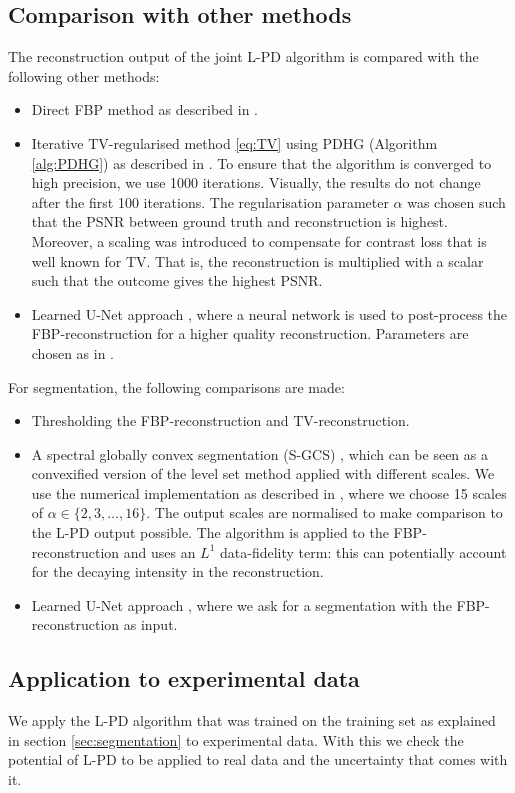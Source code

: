 \documentclass[journal]{IEEEtran}
\newcommand{\hl}[1]{#1}
\begin{document}
\subsection{Comparison with other methods}\label{sec:comparison}
{The reconstruction output of the joint L-PD algorithm is compared with the following other methods:
\begin{itemize}
\item Direct FBP method as described in \cite{Willemink2010}.
\item Iterative TV-regularised method \eqref{eq:TV} using PDHG (Algorithm \ref{alg:PDHG}) as described in \cite{Boink2018}. To ensure that the algorithm is converged to high precision, we use 1000 iterations. Visually, the results do not change after the first 100 iterations. The regularisation parameter $\alpha$ was chosen such that the PSNR between ground truth and reconstruction is highest. Moreover, a scaling was introduced to compensate for contrast loss that is well known for TV. \hl{That is, the reconstruction is multiplied with a scalar such that the outcome gives the highest PSNR.}
\item Learned U-Net approach \cite{Jin2017}, where a neural network is used to post-process the FBP-reconstruction for a higher quality reconstruction. Parameters are chosen as in \cite{Jin2017}. 
\end{itemize}
For segmentation, the following comparisons are made:
\begin{itemize}
\item Thresholding the FBP-reconstruction and TV-reconstruction.
\item A spectral globally convex segmentation (S-GCS) \cite{Zeune2017}, which can be seen as a convexified version of the level set method \cite{Goldstein2010} applied with different scales. We use the numerical implementation as described in \cite{Zeune2017}, where we choose 15 scales of $\alpha\in\{2,3,\dots,16\}$.   The output scales are normalised to make comparison to the L-PD output possible. The algorithm is applied to the FBP-reconstruction and uses an $L^1$ data-fidelity term: this can potentially account for the decaying intensity in the reconstruction. 
\item Learned U-Net approach \cite{Ronneberger2015}, where we ask for a segmentation with the FBP-reconstruction as input.
\end{itemize}
}

\subsection{Application to experimental data}\label{sec:exp_phantom}
{We apply the L-PD algorithm that was trained on the training set as explained in section \ref{sec:segmentation} to experimental data. With this we check the potential of L-PD to be applied to real data and the uncertainty that comes with it.}
\end{document}
